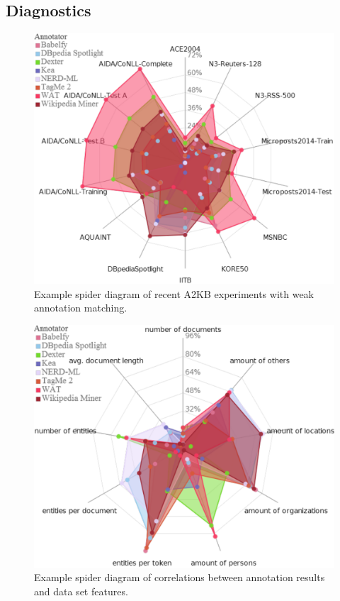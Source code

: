 \subsection{Diagnostics}
\begin{figure}[htb!]
\centering
\includegraphics[scale=0.7]{part_02/benchmarking/WWW_GERBIL/results.pdf}
\caption{Example spider diagram of recent A2KB experiments with weak annotation matching.}
\label{cha333:fig:spiderfmeasure}
\end{figure}

\begin{figure}[htb!]
\centering
\includegraphics[scale=0.7]{part_02/benchmarking/WWW_GERBIL/correlations.pdf}
\caption{Example spider diagram of correlations between annotation results and data set features.}
\label{cha333:fig:spidercorrelations}
\end{figure}

